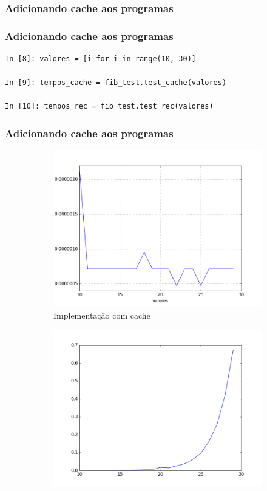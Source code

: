 \documentclass[aspectratio=169]{beamer}
\begin{document}
\begin{frame}[fragile]
	\frametitle{Adicionando cache aos programas}
	
\end{frame}

\begin{frame}[fragile]
	\frametitle{Adicionando cache aos programas}
	\begin{lstlisting}
In [8]: valores = [i for i in range(10, 30)]

In [9]: tempos_cache = fib_test.test_cache(valores)

In [10]: tempos_rec = fib_test.test_rec(valores)
	\end{lstlisting}
\end{frame}

\begin{frame}
	\frametitle{Adicionando cache aos programas}
	\begin{figure}
		\centering
		\begin{subfigure}{.5\textwidth}
		  \centering
		  \includegraphics[width=.95\linewidth]{python_imgs/test_cache}
		  \caption{Implementação com cache}
		  \label{fig:sub1}
		\end{subfigure}%
		\begin{subfigure}{.5\textwidth}
		  \centering
		  \includegraphics[width=.95\linewidth]{python_imgs/test_rec}

\end{subfigure}
\end{figure}
\end{frame}
\end{document}
